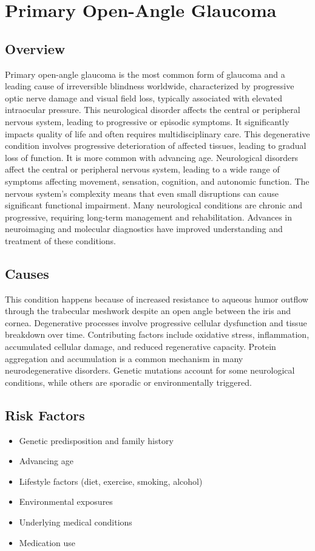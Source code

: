 \chapter{Primary Open-Angle Glaucoma}
\label{sec:Primary Open-Angle Glaucoma}

\section{Overview}
Primary open-angle glaucoma is the most common form of glaucoma and a leading cause of irreversible blindness worldwide, characterized by progressive optic nerve damage and visual field loss, typically associated with elevated intraocular pressure. This neurological disorder affects the central or peripheral nervous system, leading to progressive or episodic symptoms. It significantly impacts quality of life and often requires multidisciplinary care. This degenerative condition involves progressive deterioration of affected tissues, leading to gradual loss of function. It is more common with advancing age. Neurological disorders affect the central or peripheral nervous system, leading to a wide range of symptoms affecting movement, sensation, cognition, and autonomic function. The nervous system's complexity means that even small disruptions can cause significant functional impairment. Many neurological conditions are chronic and progressive, requiring long-term management and rehabilitation. Advances in neuroimaging and molecular diagnostics have improved understanding and treatment of these conditions.
\section{Causes}
This condition happens because of increased resistance to aqueous humor outflow through the trabecular meshwork despite an open angle between the iris and cornea.   Degenerative processes involve progressive cellular dysfunction and tissue breakdown over time. Contributing factors include oxidative stress, inflammation, accumulated cellular damage, and reduced regenerative capacity.  Protein aggregation and accumulation is a common mechanism in many neurodegenerative disorders.  Genetic mutations account for some neurological conditions, while others are sporadic or environmentally triggered.   
\section{Risk Factors}
\begin{itemize}[noitemsep]
  \item Genetic predisposition and family history
  \item Advancing age
  \item Lifestyle factors (diet, exercise, smoking, alcohol)
  \item Environmental exposures
  \item Underlying medical conditions
  \item Medication use
\end{itemize}
